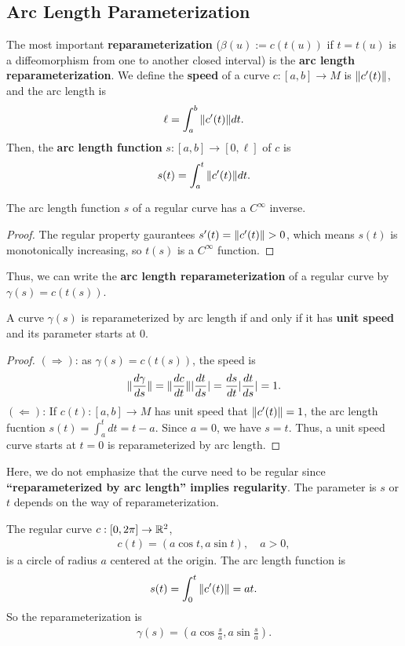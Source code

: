 \subsection{Arc Length Parameterization}
The most important \textbf{reparameterization} ($\beta(u):=c(t(u))$ if $t=t(u)$ 
is a diffeomorphism from one to another closed interval) 
is the \textbf{arc length reparameterization}.
We define the \textbf{speed} of a curve $c: [a,b]\rightarrow M$ is $\| c'(t) \|$, and the
arc length is
\begin{align}
    \ell = \int_{a}^{b} \| c'(t) \|dt. \nonumber
\end{align}
Then, the \textbf{arc length function} $s: [a, b] \rightarrow [0, \ell]$ of $c$ is
\begin{align}
    s(t)=\int_{a}^{t} \| c'(t) \|dt. \nonumber
\end{align}
\begin{proposition}
    The arc length function $s$ of a regular curve has a $C^\infty$ inverse.
\end{proposition}
\begin{proof}
    The regular property gaurantees $s'(t)=\| c'(t) \| > 0$, which means $s(t)$ 
    is monotonically increasing, so $t(s)$ is a $C^\infty$ function.
\end{proof}
Thus, we can write the \textbf{arc length reparameterization} of a regular curve
 by $\gamma(s)=c(t(s))$.
\begin{proposition}
    A curve $\gamma(s)$ is reparameterized by arc length if and only if it has \textbf{unit speed} and
    its parameter starts at $0$.
\end{proposition}
\begin{proof}
    $(\Rightarrow)$: as $\gamma(s)=c(t(s))$, the speed is
    \begin{align}
        \| \frac{d\gamma}{ds} \| = \| \frac{dc}{dt} \| |\frac{dt}{ds}|
        =\frac{ds}{dt} |\frac{dt}{ds}|=1.
    \end{align}
$(\Leftarrow)$: If $c(t): [a, b]\rightarrow M$ has unit speed that $\| c'(t) \|=1$,
 the arc length fucntion $s(t)=\int_{a}^{t}dt=t-a$. Since $a=0$, we have $s=t$. Thus, a unit speed curve
 starts at $t=0$ is reparameterized by arc length.
\end{proof}
Here, we do not emphasize that the curve need to be regular since 
\textbf{``reparameterized by arc length'' implies regularity}. The parameter is $s$ or $t$ depends on the
way of reparameterization.
\begin{example}
    The regular curve $c: [0, 2\pi] \rightarrow {\mathbb{R}}^2$,
    \begin{align}
        c(t)=(a\cos t, a\sin t), \quad a > 0, \nonumber
    \end{align}
    is a circle of radius $a$ centered at the origin. The arc length function is
    \begin{align}
        s(t) = \int_{0}^{t} \| c'(t) \| = at. \nonumber
    \end{align}
    So the reparameterization is
    \begin{align}
        \gamma(s) = (a \cos \frac{s}{a}, a \sin \frac{s}{a}). \nonumber
    \end{align}
\end{example}
